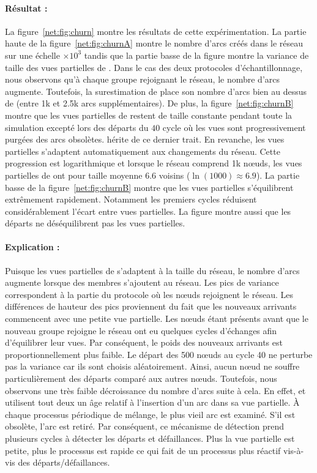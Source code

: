 \paragraph{Résultat :} La figure~\ref{net:fig:churn} montre les résultats de
cette expérimentation. La partie haute de la figure~\ref{net:fig:churnA} montre
le nombre d'arcs créés dans le réseau sur une échelle $\times 10^3$ tandis que
la partie basse de la figure montre la variance de taille des vues partielles de
\SPRAY. Dans le cas des deux protocoles d'échantillonnage, nous observons qu'à
chaque groupe rejoignant le réseau, le nombre d'arcs augmente. Toutefois, la
surestimation de \CYCLON place son nombre d'arcs bien au dessus de \SPRAY (entre
1k et 2.5k arcs supplémentaires). De plus, la figure~\ref{net:fig:churnB} montre
que les vues partielles de \CYCLON restent de taille constante pendant toute la
simulation excepté lors des départs du $40$ cycle où les vues sont
progressivement purgées des arcs obsolètes. \SPRAY hérite de ce dernier
trait. En revanche, les vues partielles s'adaptent automatiquement aux
changements du réseau. Cette progression est logarithmique et lorsque le réseau
comprend 1k nœuds, les vues partielles de \SPRAY ont pour taille moyenne 6.6
voisins ($\ln(1000)\approx6.9$). La partie basse de la
figure~\ref{net:fig:churnB} montre que les vues partielles s'équilibrent
extrêmement rapidement. Notamment les premiers cycles réduisent considérablement
l'écart entre vues partielles. La figure montre aussi que les départs ne
déséquilibrent pas les vues partielles.

\paragraph{Explication :} Puisque les vues partielles de \SPRAY s'adaptent à la
taille du réseau, le nombre d'arcs augmente lorsque des membres s'ajoutent
au réseau. Les pics de variance correspondent à la partie du protocole où les
nœuds rejoignent le réseau. Les différences de hauteur des pics proviennent du
fait que les nouveaux arrivants commencent avec une petite vue partielle. Les
nœuds étant présents avant que le nouveau groupe rejoigne le réseau ont eu
quelques cycles d'échanges afin d'équilibrer leur vues. Par conséquent, le poids
des nouveaux arrivants est proportionnellement plus faible. Le départ des 500
nœuds au cycle 40 ne perturbe pas la variance car ils sont choisis
aléatoirement. Ainsi, aucun nœud ne souffre particulièrement des départs comparé
aux autres nœuds. Toutefois, nous observons une très faible décroissance du
nombre d'arcs suite à cela. En effet, \CYCLON et \SPRAY utilisent tout deux un
âge relatif à l'insertion d'un arc dans sa vue partielle. À chaque processus
périodique de mélange, le plus vieil arc est examiné. S'il est obsolète, l'arc
est retiré. Par conséquent, ce mécanisme de détection prend plusieurs cycles à
détecter les départs et défaillances. Plus la vue partielle est petite, plus le
processus est rapide ce qui fait de \SPRAY un processus plus réactif vis-à-vis
des départs/défaillances.

